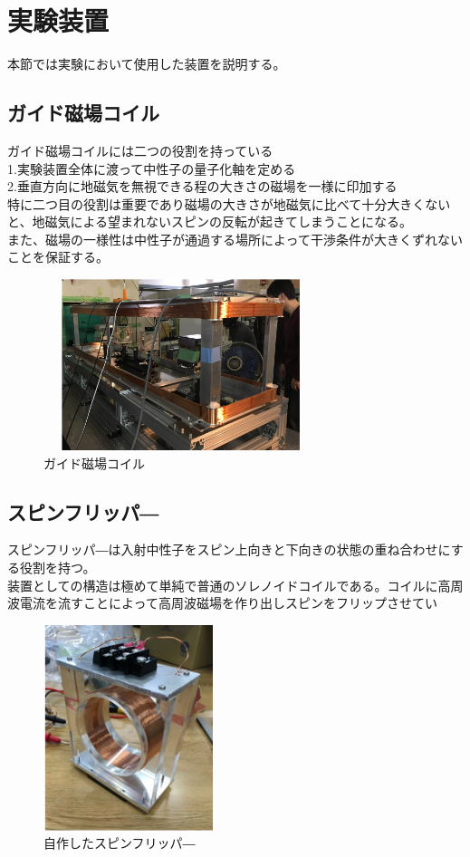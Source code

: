 
\section{実験装置}
本節では実験において使用した装置を説明する。
\subsection{ガイド磁場コイル}
ガイド磁場コイルには二つの役割を持っている\\
1.実験装置全体に渡って中性子の量子化軸を定める\\
2.垂直方向に地磁気を無視できる程の大きさの磁場を一様に印加する\\
特に二つ目の役割は重要であり磁場の大きさが地磁気に比べて十分大きくないと、地磁気による望まれないスピンの反転が起きてしまうことになる。
\\また、磁場の一様性は中性子が通過する場所によって干渉条件が大きくずれないことを保証する。
\begin{figure}[h]
\begin{center}
\includegraphics[width=8cm,height=5cm]{device/coilphoto.pdf}\caption{ガイド磁場コイル}
\end{center}
\end{figure}
\subsection{スピンフリッパ―}
スピンフリッパ―は入射中性子をスピン上向きと下向きの状態の重ね合わせにする役割を持つ。\\
装置としての構造は極めて単純で普通のソレノイドコイルである。コイルに高周波電流を流すことによって高周波磁場を作り出しスピンをフリップさせてい
\begin{figure}[H]
\begin{center}
\includegraphics[width=5cm,height=6cm]{device/spinflipperphoto.pdf}\caption{自作したスピンフリッパ―}
\end{center}
\end{figure}
